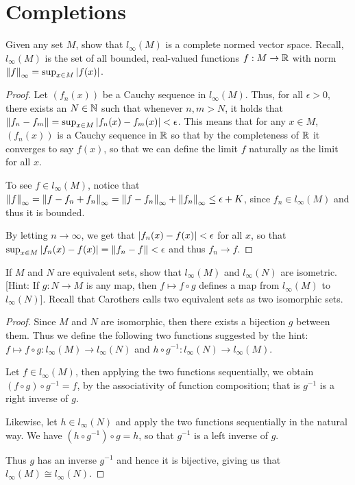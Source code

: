 \section{Completions}


\begin{exercise}{44}
Given any set $M$, show that $l_\infty(M)$ is a complete normed vector space.
Recall, $l_\infty(M)$ is the set of all bounded, real-valued functions $f:M\to\mathbb{R}$ with norm $\left\lVert f\right\rVert_\infty=\sup_{x\in M}\left\lvert f(x)\right\rvert$.
\end{exercise}
\begin{proof}
Let $(f_n(x))$ be a Cauchy sequence in $l_\infty(M)$.
Thus, for all $\epsilon>0$, there exists an $N\in\mathbb{N}$ such that whenever $n,m>N$, it holds that $\left\lVert f_n-f_m\right\rVert = \sup_{x\in M}\left\lvert f_n(x)-f_m(x)\right\rvert < \epsilon$.
This means that for any $x\in M$, $(f_n(x))$ is a Cauchy sequence in $\mathbb{R}$ so that by the completeness of $\mathbb{R}$ it converges to say $f(x)$, so that we can define the limit $f$ naturally as the limit for all $x$.

To see $f\in l_\infty(M)$, notice that $\left\lVert f\right\rVert_\infty = \left\lVert f-f_n+f_n\right\rVert_\infty = \left\lVert f-f_n\right\rVert_\infty + \left\lVert f_n\right\rVert_\infty \leq \epsilon + K$, since $f_n\in l_\infty(M)$ and thus it is bounded.

By letting $n\to\infty$, we get that $\left\lvert f_n(x)-f(x)\right\rvert<\epsilon$ for all $x$, so that $\sup_{x\in M}\left\lvert f_n(x)-f(x)\right\rvert = \left\lVert f_n-f\right\rVert < \epsilon$ and thus $f_n\to f$.
\end{proof} 

\begin{exercise}{45}
If $M$ and $N$ are equivalent sets, show that $l_\infty(M)$ and $l_\infty(N)$ are isometric.
[Hint: If $g:N\to M$ is any map, then $f\mapsto f\circ g$ defines a map from $l_\infty(M)$ to $l_\infty(N)$].
Recall that Carothers calls two equivalent sets as two isomorphic sets.
\end{exercise}
\begin{proof}
Since $M$ and $N$ are isomorphic, then there exists a bijection $g$ between them. 
Thus we define the following two functions suggested by the hint: $f\mapsto f\circ g: l_\infty(M) \to l_\infty(N)$ and $h\circ g^{-1}: l_\infty(N) \to l_\infty(M)$.

Let $f\in l_\infty(M)$, then applying the two functions sequentially, we obtain $(f\circ g) \circ g^{-1} = f$, by the associativity of function composition;
that is $g^{-1}$ is a right inverse of $g$.

Likewise, let $h\in l_\infty(N)$ and apply the two functions sequentially in the natural way.
We have $(h\circ g^{-1})\circ g = h$, so that $g^{-1}$ is a left inverse of $g$.

Thus $g$ has an inverse $g^{-1}$ and hence it is bijective, giving us that $l_\infty(M)\cong l_\infty(N)$.
\end{proof} 


